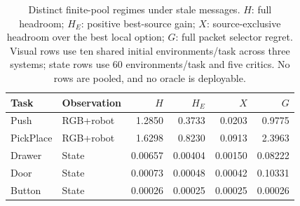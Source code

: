 \begin{table}[tb]\centering\small
\caption{Distinct finite-pool regimes under stale messages. $H$: full headroom; $H_E$: positive best-source gain; $X$: source-exclusive headroom over the best local option; $G$: full packet selector regret. Visual rows use ten shared initial environments/task across three systems; state rows use 60 environments/task and five critics. No rows are pooled, and no oracle is deployable.}\label{tab:headroom}\label{tab:visualoracle}
\begin{tabular}{llrrrr}\toprule Task & Observation & $H$ & $H_E$ & $X$ & $G$\\\midrule
Push & RGB+robot & 1.2850 & 0.3733 & 0.0203 & 0.9775\\
PickPlace & RGB+robot & 1.6298 & 0.8230 & 0.0913 & 2.3963\\
Drawer & State & 0.00657 & 0.00404 & 0.00150 & 0.08222\\
Door & State & 0.00073 & 0.00048 & 0.00042 & 0.10331\\
Button & State & 0.00026 & 0.00025 & 0.00025 & 0.00026\\\bottomrule
\end{tabular}
\end{table}

